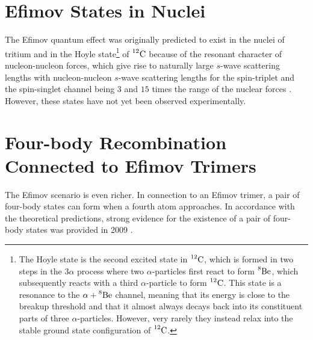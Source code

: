 \section{Efimov States in Nuclei }
The Efimov quantum effect was originally predicted to exist in the nuclei of tritium and in the Hoyle state\footnote{The Hoyle state is the second excited state in $\prescript{12}{}{\mathrm{C}}$, which is formed in two steps in the $3\alpha$ process where two $\alpha$-particles first react to form $\prescript{8}{}{\mathrm{Be}}$, which subsequently reacts with a third $\alpha$-particle to form $\prescript{12}{}{\mathrm{C}}$. This state is a resonance to the $\alpha + \prescript{8}{}{\mathrm{Be}}$ channel, meaning that its energy is close to the breakup threshold and that it almost always decays back into its constituent parts of three $\alpha$-particles. However, very rarely they instead relax into the stable ground state configuration of $\prescript{12}{}{\mathrm{C}}$.} of $\prescript{12}{}{\mathrm{C}}$ because of the resonant character of nucleon-nucleon forces, which give rise to naturally large $s$-wave scattering lengths with nucleon-nucleon $s$-wave scattering lengths for the spin-triplet and the spin-singlet channel being $3$ and $15$ times the range of the nuclear forces \cite{Efimov:1970zz,Efimov:1971zz}.  However, these states have not yet been observed experimentally. 

\section{Four-body Recombination Connected to Efimov Trimers} 
The Efimov scenario is even richer. In connection to an Efimov trimer, a pair of four-body states can form when a fourth atom approaches. In accordance with the theoretical predictions, strong evidence for the existence of a pair of four-body states was provided in 2009 \cite{Grimm:2009}.